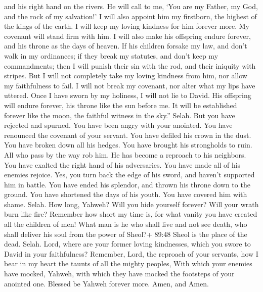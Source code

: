 and his right hand on the rivers.  He will call to me, `You
are my Father, my God, and the rock of my salvation!'  I
will also appoint him my firstborn, the highest of the kings of the
earth.  I will keep my loving kindness for him forever
more. My covenant will stand firm with him.  I will also
make his offspring endure forever, and his throne as the days of heaven.
 If his children forsake my law, and don't walk in my
ordinances;  if they break my statutes, and don't keep my
commandments;  then I will punish their sin with the rod,
and their iniquity with stripes.  But I will not completely
take my loving kindness from him, nor allow my faithfulness to fail.
 I will not break my covenant, nor alter what my lips have
uttered.  Once I have sworn by my holiness, I will not lie
to David.  His offspring will endure forever, his throne
like the sun before me.  It will be established forever
like the moon, the faithful witness in the sky.'' Selah. 
But you have rejected and spurned. You have been angry with your
anointed.  You have renounced the covenant of your servant.
You have defiled his crown in the dust.  You have broken
down all his hedges. You have brought his strongholds to ruin.
 All who pass by the way rob him. He has become a reproach
to his neighbors.  You have exalted the right hand of his
adversaries. You have made all of his enemies rejoice. 
Yes, you turn back the edge of his sword, and haven't supported him in
battle.  You have ended his splendor, and thrown his throne
down to the ground.  You have shortened the days of his
youth. You have covered him with shame. Selah.  How long,
Yahweh? Will you hide yourself forever? Will your wrath burn like fire?
 Remember how short my time is, for what vanity you have
created all the children of men!  What man is he who shall
live and not see death, who shall deliver his soul from the power of
Sheol?+ 89:48 Sheol is the place of the dead. Selah.  Lord,
where are your former loving kindnesses, which you swore to David in
your faithfulness?  Remember, Lord, the reproach of your
servants, how I bear in my heart the taunts of all the mighty peoples,
 With which your enemies have mocked, Yahweh, with which
they have mocked the footsteps of your anointed one. 
Blessed be Yahweh forever more. Amen, and Amen.

